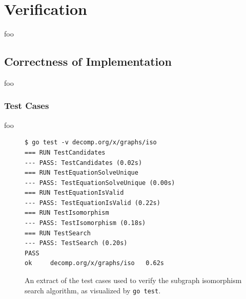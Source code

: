 
\section{Verification}
\label{sec:verification}


foo


\subsection{Correctness of Implementation}



foo

\subsubsection{Test Cases}





foo

\begin{figure}[htbp]
	\begin{center}
		\begin{verbatim}
$ go test -v decomp.org/x/graphs/iso
=== RUN TestCandidates
--- PASS: TestCandidates (0.02s)
=== RUN TestEquationSolveUnique
--- PASS: TestEquationSolveUnique (0.00s)
=== RUN TestEquationIsValid
--- PASS: TestEquationIsValid (0.22s)
=== RUN TestIsomorphism
--- PASS: TestIsomorphism (0.18s)
=== RUN TestSearch
--- PASS: TestSearch (0.20s)
PASS
ok     decomp.org/x/graphs/iso   0.62s
		\end{verbatim}
		\caption{An extract of the test cases used to verify the subgraph isomorphism search algorithm, as visualized by \texttt{go test}.}
		\label{fig:iso_test_cases}
	\end{center}
\end{figure}

